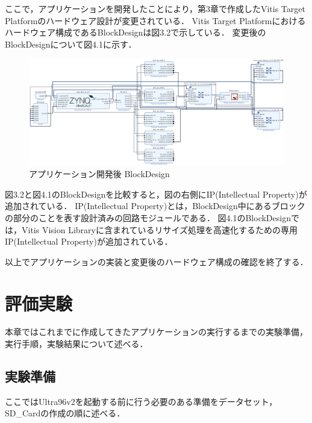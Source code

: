 \documentclass[11pt,a4j]{jreport}
\begin{document}
ここで，アプリケーションを開発したことにより，第3章で作成したVitis Target Platformのハードウェア設計が変更されている．
Vitis Target Platformにおけるハードウェア構成であるBlockDesignは図3.2で示している．
変更後のBlockDesignについて図4.1に示す．
\begin{figure}[H]
  \center
  \includegraphics[scale = 0.3]{pict/pict11.jpg}
  \caption{アプリケーション開発後 BlockDesign}
\end{figure}
図3.2と図4.1のBlockDesignを比較すると，図の右側にIP(Intellectual Property)が追加されている．
IP(Intellectual Property)とは，BlockDesign中にあるブロックの部分のことを表す設計済みの回路モジュールである．
図4.1のBlockDesignでは，Vitis Vision Libraryに含まれているリサイズ処理を高速化するための専用IP(Intellectual Property)が追加されている．

以上でアプリケーションの実装と変更後のハードウェア構成の確認を終了する．
\chapter{評価実験}
本章ではこれまでに作成してきたアプリケーションの実行するまでの実験準備，実行手順，実験結果について述べる．
\section{実験準備}
ここではUltra96v2を起動する前に行う必要のある準備をデータセット，SD_Cardの作成の順に述べる．
\end{document}
